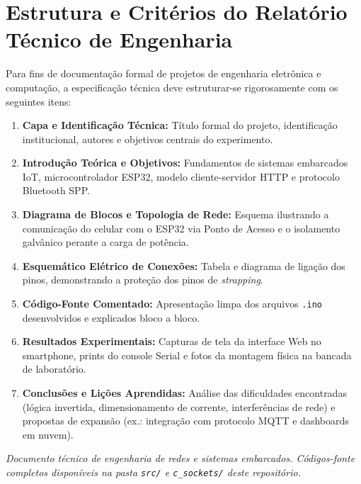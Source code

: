 \documentclass[a4paper,11pt]{article}
\begin{document}
\section{Estrutura e Critérios do Relatório Técnico de Engenharia}

Para fins de documentação formal de projetos de engenharia eletrônica e computação, a especificação técnica deve estruturar-se rigorosamente com os seguintes itens:

\begin{enumerate}
    \item \textbf{Capa e Identificação Técnica:} Título formal do projeto, identificação institucional, autores e objetivos centrais do experimento.
    \item \textbf{Introdução Teórica e Objetivos:} Fundamentos de sistemas embarcados IoT, microcontrolador ESP32, modelo cliente-servidor HTTP e protocolo Bluetooth SPP.
    \item \textbf{Diagrama de Blocos e Topologia de Rede:} Esquema ilustrando a comunicação do celular com o ESP32 via Ponto de Acesso e o isolamento galvânico perante a carga de potência.
    \item \textbf{Esquemático Elétrico de Conexões:} Tabela e diagrama de ligação dos pinos, demonstrando a proteção dos pinos de \textit{strapping}.
    \item \textbf{Código-Fonte Comentado:} Apresentação limpa dos arquivos \texttt{.ino} desenvolvidos e explicados bloco a bloco.
    \item \textbf{Resultados Experimentais:} Capturas de tela da interface Web no smartphone, prints do console Serial e fotos da montagem física na bancada de laboratório.
    \item \textbf{Conclusões e Lições Aprendidas:} Análise das dificuldades encontradas (lógica invertida, dimensionamento de corrente, interferências de rede) e propostas de expansão (ex.: integração com protocolo MQTT e dashboards em nuvem).
\end{enumerate}

\vfill
\begin{center}
    \textit{Documento técnico de engenharia de redes e sistemas embarcados. Códigos-fonte completos disponíveis na pasta \texttt{src/} e \texttt{c\_sockets/} deste repositório.}
\end{center}
\end{document}
